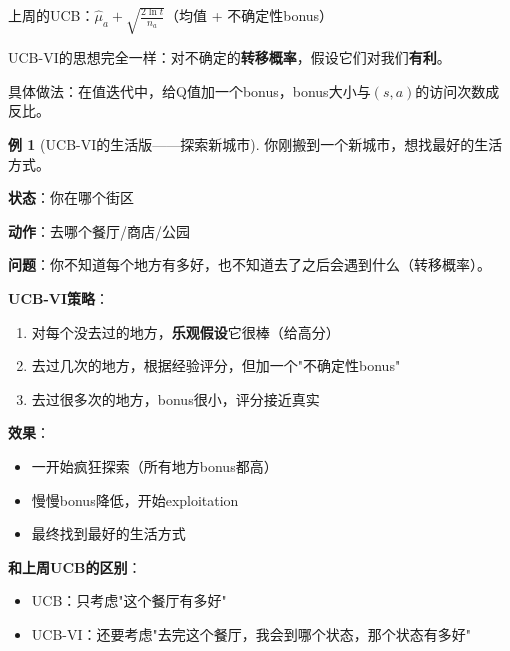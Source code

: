 \documentclass[11pt,a4paper]{article}
\theoremstyle{definition}
\newtheorem{example}{例}[section]
\begin{document}
\begin{plainwords}[核心思想]
上周的UCB：$\hat{\mu}_a + \sqrt{\frac{2\ln t}{n_a}}$（均值 + 不确定性bonus）

UCB-VI的思想完全一样：对不确定的\textbf{转移概率}，假设它们对我们\textbf{有利}。

具体做法：在值迭代中，给Q值加一个bonus，bonus大小与$(s,a)$的访问次数成反比。
\end{plainwords}

\begin{example}[UCB-VI的生活版——探索新城市]
你刚搬到一个新城市，想找最好的生活方式。

\textbf{状态}：你在哪个街区

\textbf{动作}：去哪个餐厅/商店/公园

\textbf{问题}：你不知道每个地方有多好，也不知道去了之后会遇到什么（转移概率）。

\textbf{UCB-VI策略}：
\begin{enumerate}
    \item 对每个没去过的地方，\textbf{乐观假设}它很棒（给高分）
    \item 去过几次的地方，根据经验评分，但加一个"不确定性bonus"
    \item 去过很多次的地方，bonus很小，评分接近真实
\end{enumerate}

\textbf{效果}：
\begin{itemize}
    \item 一开始疯狂探索（所有地方bonus都高）
    \item 慢慢bonus降低，开始exploitation
    \item 最终找到最好的生活方式
\end{itemize}

\textbf{和上周UCB的区别}：
\begin{itemize}
    \item UCB：只考虑"这个餐厅有多好"
    \item UCB-VI：还要考虑"去完这个餐厅，我会到哪个状态，那个状态有多好"
\end{itemize}
\end{example}
\end{document}
